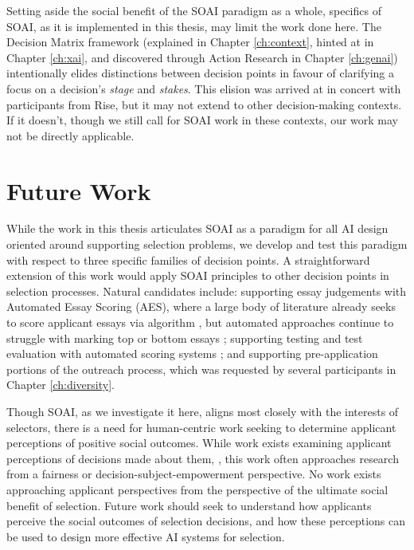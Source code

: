 Setting aside the social benefit of the SOAI paradigm as a whole, specifics of SOAI, as it is implemented in this thesis, may limit the work done here. The Decision Matrix framework (explained in Chapter \ref{ch:context}, hinted at in Chapter \ref{ch:xai}, and discovered through Action Research in Chapter \ref{ch:genai}) intentionally elides distinctions between decision points in favour of clarifying a focus on a decision's \emph{stage} and \emph{stakes}. This elision was arrived at in concert with participants from Rise, but it may not extend to other decision-making contexts. If it doesn't, though we still call for SOAI work in these contexts, our work may not be directly applicable.

\section{Future Work}
While the work in this thesis articulates SOAI as a paradigm for all AI design oriented around supporting selection problems, we develop and test this paradigm with respect to three specific families of decision points. A straightforward extension of this work would apply SOAI principles to other decision points in selection processes. Natural candidates include: supporting essay judgements with Automated Essay Scoring (AES), where a large body of literature already seeks to score applicant essays via algorithm \cite{cozma_automated_2018,ramesh_automated_2022,wang_use_2022,elijahthesis}, but automated approaches continue to struggle with marking top or bottom essays \cite{elijahthesis}; supporting testing and test evaluation with automated scoring systems \cite{organisciak_beyond_2023,condon2014international}; and supporting pre-application portions of the outreach process, which was requested by several participants in Chapter \ref{ch:diversity}.

Though SOAI, as we investigate it here, aligns most closely with the interests of selectors, there is a need for human-centric work seeking to determine applicant perceptions of positive social outcomes. While work exists examining applicant perceptions of decisions made about them, \cite{pandey_applicants_2022,horodyski_applicants_2023}, this work often approaches research from a fairness or decision-subject-empowerment perspective. No work exists approaching applicant perspectives from the perspective of the ultimate social benefit of selection. Future work should seek to understand how applicants perceive the social outcomes of selection decisions, and how these perceptions can be used to design more effective AI systems for selection.

